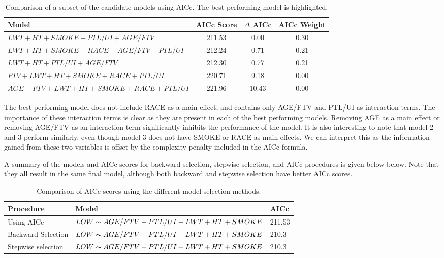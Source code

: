 \renewcommand\arraystretch{1.2}
\begin{table}[ht]
    \centering
    \begin{tabular}[t]{lccc}
        \toprule
        Model & AICc Score & $\Delta$ AICc & AICc Weight \\
        \midrule
        \rowcolor{blue!15}
        \small{$LWT+HT+SMOKE+PTL/UI+AGE/FTV$} & 211.53 & 0.00 & 0.30 \\
        \small{$LWT+HT+SMOKE+RACE+AGE/FTV+PTL/UI$} & 212.24 & 0.71 & 0.21 \\
        \small{$LWT+HT+PTL/UI+AGE/FTV$} & 212.30 & 0.77 & 0.21 \\
        \small{$FTV+LWT+HT+SMOKE+RACE+PTL/UI$} & 220.71 & 9.18 & 0.00 \\
        \small{$AGE+FTV+LWT+HT+SMOKE+RACE+PTL/UI$} & 221.96 & 10.43 & 0.00 \\
        \bottomrule
    \end{tabular}
    \caption{Comparison of a subset of the candidate models using AICc. The best performing model is highlighted.}
    \label{tab:ModelTwoComparison}
\end{table}%

The best performing model does not include RACE as a main effect, and contains only AGE/FTV and PTL/UI as interaction terms. The importance of these interaction terms is clear as they are present in each of the best performing models. Removing AGE as a main effect or removing AGE/FTV as an interaction term significantly inhibits the performance of the model. It is also interesting to note that model 2 and 3 perform similarly, even though model 3 does not have SMOKE or RACE as main effects. We can interpret this as the information gained from these two variables is offset by the complexity penalty included in the AICc formula.

A summary of the models and AICc scores for backward selection, stepwise selection, and AICc procedures is given below below. Note that they all result in the same final model, although both backward and stepwise selection have better AICc scores.

\vspace{0.3cm}
\renewcommand\arraystretch{1.2}
\begin{table}[ht]
    \centering
    \begin{tabular}[t]{lll}
        \toprule
        Procedure & Model & AICc \\
        \midrule
        Using AICc & $LOW\thicksim AGE/FTV+PTL/UI+LWT+HT+SMOKE$ & 211.53 \\
        Backward Selection & $LOW\thicksim AGE/FTV+PTL/UI+LWT+HT+SMOKE$ & 210.3 \\
        Stepwise selection & $LOW\thicksim AGE/FTV+PTL/UI+LWT+HT+SMOKE$ & 210.3 \\
        \bottomrule
    \end{tabular}
    \caption{Comparison of AICc scores using the different model selection methods.}
    \label{tab:comparison-8variables}
\end{table}%

